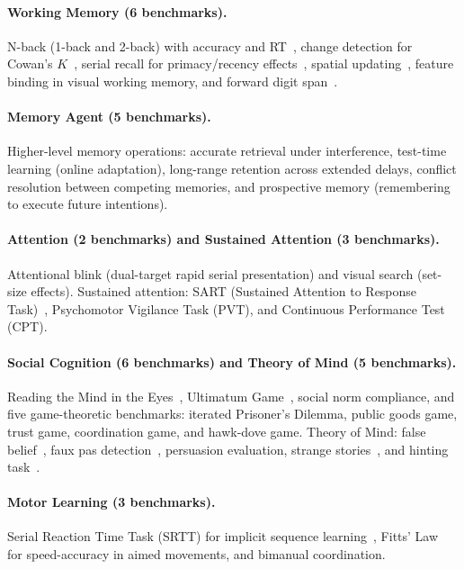 \documentclass[11pt,letterpaper]{article}
\begin{document}
\paragraph{Working Memory (6 benchmarks).} N-back (1-back and 2-back) with accuracy and RT~\citep{jaeggi2010relationship,owen2005nback}, change detection for Cowan's $K$~\citep{luck1997capacity,cowan2001magical}, serial recall for primacy/recency effects~\citep{murdock1962serial}, spatial updating~\citep{oberauer2003selective}, feature binding in visual working memory, and forward digit span~\citep{wechsler2008wais}.

\paragraph{Memory Agent (5 benchmarks).} Higher-level memory operations: accurate retrieval under interference, test-time learning (online adaptation), long-range retention across extended delays, conflict resolution between competing memories, and prospective memory (remembering to execute future intentions).

\paragraph{Attention (2 benchmarks) and Sustained Attention (3 benchmarks).} Attentional blink (dual-target rapid serial presentation) and visual search (set-size effects). Sustained attention: SART (Sustained Attention to Response Task)~\citep{robertson1997sustained}, Psychomotor Vigilance Task (PVT), and Continuous Performance Test (CPT).

\paragraph{Social Cognition (6 benchmarks) and Theory of Mind (5 benchmarks).} Reading the Mind in the Eyes~\citep{baroncohen2001eyes}, Ultimatum Game~\citep{guth1982experimental}, social norm compliance, and five game-theoretic benchmarks: iterated Prisoner's Dilemma, public goods game, trust game, coordination game, and hawk-dove game. Theory of Mind: false belief~\citep{baroncohen1985mindblindness}, faux pas detection~\citep{stone1998faux}, persuasion evaluation, strange stories~\citep{happe1994advanced}, and hinting task~\citep{corcoran1995schizophrenia}.

\paragraph{Motor Learning (3 benchmarks).} Serial Reaction Time Task (SRTT) for implicit sequence learning~\citep{nissen1987attentional}, Fitts' Law~\citep{fitts1954information} for speed-accuracy in aimed movements, and bimanual coordination.
\end{document}
